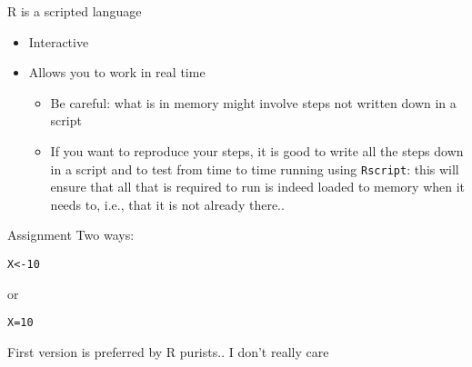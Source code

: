 \documentclass[aspectratio=169]{beamer}\usepackage[]{graphicx}\usepackage[]{xcolor}
\makeatletter
\newcommand{\hlnum}[1]{\textcolor[rgb]{0.686,0.059,0.569}{#1}}%
\newcommand{\hldef}[1]{\textcolor[rgb]{0.345,0.345,0.345}{#1}}%
\newcommand{\hlkwb}[1]{\textcolor[rgb]{0.69,0.353,0.396}{#1}}%
\newenvironment{kframe}{%
 \def\at@end@of@kframe{}%
 \ifinner\ifhmode%
  \def\at@end@of@kframe{\end{minipage}}%
  \begin{minipage}{\columnwidth}%
 \fi\fi%
 \def\FrameCommand##1{\hskip\@totalleftmargin \hskip-\fboxsep
 \colorbox{shadecolor}{##1}\hskip-\fboxsep
     \hskip-\linewidth \hskip-\@totalleftmargin \hskip\columnwidth}%
 \MakeFramed {\advance\hsize-\width
   \@totalleftmargin\z@ \linewidth\hsize
   \@setminipage}}%
 {\par\unskip\endMakeFramed%
 \at@end@of@kframe}
\newenvironment{knitrout}{}{} %
\makeatother
\begin{document}

\begin{frame}{R is a scripted language}
\begin{itemize}
\item Interactive
\vfill
\item Allows you to work in real time
\vfill
    \begin{itemize}
    \item Be careful: what is in memory might involve steps not written down in a script
    \vfill
    \item If you want to reproduce your steps, it is good to write all the steps down in a script and to test from time to time running using \texttt{Rscript}: this will ensure that all that is required to run is indeed loaded to memory when it needs to, i.e., that it is not already there..
    \end{itemize}
\end{itemize}
\end{frame}


\begin{frame}{Assignment}
Two ways:

\begin{knitrout}
\color{fgcolor}\begin{kframe}
\begin{alltt}
\hldef{X} \hlkwb{<-} \hlnum{10}
\end{alltt}
\end{kframe}
\end{knitrout}

or

\begin{knitrout}
\color{fgcolor}\begin{kframe}
\begin{alltt}
\hldef{X} \hlkwb{=} \hlnum{10}
\end{alltt}
\end{kframe}
\end{knitrout}

First version is preferred by R purists.. I don't really care
\end{frame}
\end{document}
